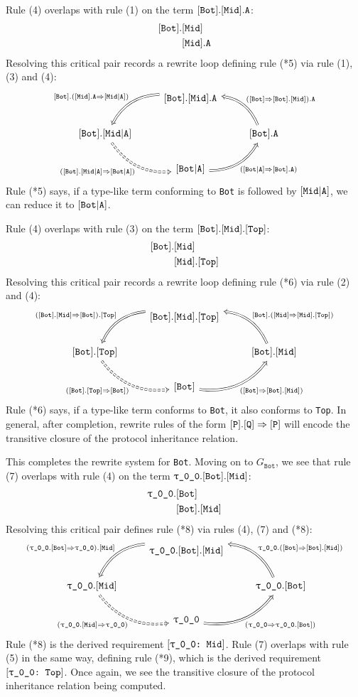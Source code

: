 \documentclass[../generics]{subfiles}
\begin{document}
\begin{example}
Rule (4) overlaps with rule (1) on the term $[\texttt{Bot}].[\texttt{Mid}].\texttt{A}$:
\begin{align*}
[\texttt{Bot}].&[\texttt{Mid}]\\
&[\texttt{Mid}].\texttt{A}
\end{align*}
Resolving this critical pair records a rewrite loop defining rule (*5) via rule (1), (3) and (4):
\[
\FourLoopDerived%
{\protosym{Bot}.\protosym{Mid}.\texttt{A}}%
{\protosym{Bot}.\assocsym{Mid}{A}}%
{\assocsym{Bot}{A}}%
{\protosym{Bot}.\texttt{A}}%
{\protosym{Bot}.(\AssocIntro{Mid}{A})}%
{(\protosym{Bot}.\assocsym{Mid}{A}\Rightarrow\assocsym{Bot}{A})}%
{(\AssocIntroInv{Bot}{A})}%
{(\ProtoInheritInv{Bot}{Mid}).\texttt{A}}
\]
Rule (*5) says, if a type-like term conforming to \texttt{Bot} is followed by $[\texttt{Mid}|\texttt{A}]$, we can reduce it to $[\texttt{Bot}|\texttt{A}]$.

Rule (4) overlaps with rule (3) on the term $[\texttt{Bot}].[\texttt{Mid}].[\texttt{Top}]$:
\begin{align*}
[\texttt{Bot}].&[\texttt{Mid}]\\
&[\texttt{Mid}].[\texttt{Top}]
\end{align*}
Resolving this critical pair records a rewrite loop defining rule (*6) via rule (2) and (4):
\[
\FourLoopDerived%
{\protosym{Bot}.\protosym{Mid}.\protosym{Top}}%
{\protosym{Bot}.\protosym{Top}}%
{\protosym{Bot}}%
{\protosym{Bot}.\protosym{Mid}}%
{(\ProtoInherit{Bot}{Mid}).\protosym{Top}}%
{(\ProtoInherit{Bot}{Top})}%
{(\ProtoInheritInv{Bot}{Mid})}%
{\protosym{Bot}.(\ProtoInheritInv{Mid}{Top})}
\]
Rule (*6) says, if a type-like term conforms to \texttt{Bot}, it also conforms to \texttt{Top}. In general, after completion, rewrite rules of the form $[\texttt{P}].[\texttt{Q}]\Rightarrow[\texttt{P}]$ will encode the transitive closure of the protocol inheritance relation.

This completes the rewrite system for \texttt{Bot}. Moving on to $G_\texttt{Bot}$, we see that rule (7) overlaps with rule (4) on the term $\texttt{$\uptau$\_0\_0}.[\texttt{Bot}].[\texttt{Mid}]$:
\begin{align*}
\texttt{$\uptau$\_0\_0}.&[\texttt{Bot}]\\
&[\texttt{Bot}].[\texttt{Mid}]
\end{align*}
Resolving this critical pair defines rule (*8) via rules (4), (7) and (*8):
\[
\FourLoopDerived%
{\ttgp{0}{0}.\protosym{Bot}.\protosym{Mid}}%
{\ttgp{0}{0}.\protosym{Mid}}%
{\ttgp{0}{0}}%
{\ttgp{0}{0}.\protosym{Bot}}%
{(\ProtoConf{\ttgp{0}{0}}{Bot}).\protosym{Mid}}%
{(\ProtoConf{\ttgp{0}{0}}{Mid})}%
{(\ProtoConfInv{\ttgp{0}{0}}{Bot})}%
{\ttgp{0}{0}.(\ProtoInheritInv{Bot}{Mid})}
\]
Rule (*8) is the derived requirement $[\texttt{\texttt{$\uptau$\_0\_0}:~Mid}]$. Rule (7) overlaps with rule (5) in the same way, defining rule (*9), which is the derived requirement $[\texttt{\texttt{$\uptau$\_0\_0}:~Top}]$. Once again, we see the transitive closure of the protocol inheritance relation being computed.


\end{example}
\end{document}
